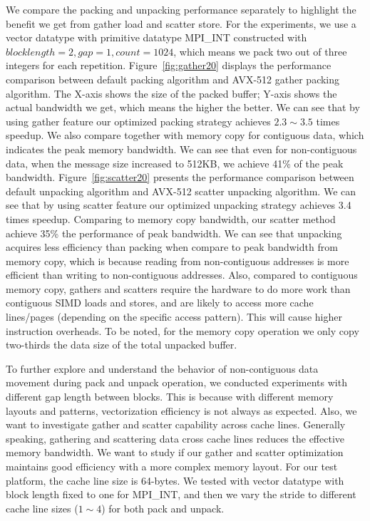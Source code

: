\documentclass[conference]{IEEEtran}
\begin{document}
We compare the packing and unpacking performance separately to highlight the
benefit we get from gather load and scatter store. For the experiments, we use a
vector datatype with primitive datatype MPI\_INT constructed with $block length
= 2, gap = 1, count = 1024$, which means we pack two out of three integers for each
repetition. Figure~\ref{fig:gather20} displays the performance comparison
between \ompi default packing algorithm and AVX-512 gather packing algorithm.
The X-axis shows the size of the packed buffer; Y-axis shows the actual
bandwidth we get, which means the higher the better. We can see that by using
gather feature our optimized packing strategy achieves $2.3 \sim 3.5$ times
speedup. We also compare together with memory copy for contiguous data, which
indicates the peak memory bandwidth. We can see that even for non-contiguous
data, when the message size increased to 512KB, we achieve 41\% of the peak
bandwidth. Figure~\ref{fig:scatter20} presents the performance comparison
between \ompi default unpacking algorithm and AVX-512 scatter unpacking
algorithm. We can see that by using scatter feature our optimized unpacking
strategy achieves 3.4 times speedup. Comparing to memory copy bandwidth, our
scatter method achieve 35\% the performance of peak bandwidth. We can see that
unpacking acquires less efficiency than packing when compare to peak bandwidth
from memory copy, which is because reading from non-contiguous addresses is more
efficient than writing to non-contiguous addresses. Also, compared to contiguous
memory copy, gathers and scatters require the hardware to do more work than
contiguous SIMD loads and stores, and are likely to access more cache
lines/pages (depending on the specific access pattern). This will cause higher
instruction overheads. To be noted, for the memory copy operation we only copy
two-thirds the data size of the total unpacked buffer.

To further explore and understand the behavior of non-contiguous data movement during pack and unpack operation,
we conducted experiments with different gap length between blocks. This is because with different memory layouts and patterns, vectorization efficiency is not always as expected. Also, we want to investigate gather and scatter capability across cache lines. Generally speaking, gathering and scattering data cross cache lines reduces the effective memory bandwidth.
We want to study if our gather and scatter optimization maintains good efficiency with a more complex memory layout.
For our test platform, the cache line size is 64-bytes. We tested with vector datatype with block length fixed to one for MPI\_INT, and then we vary the stride to different cache line sizes ($1 \sim 4$) for both pack and unpack.
\end{document}
